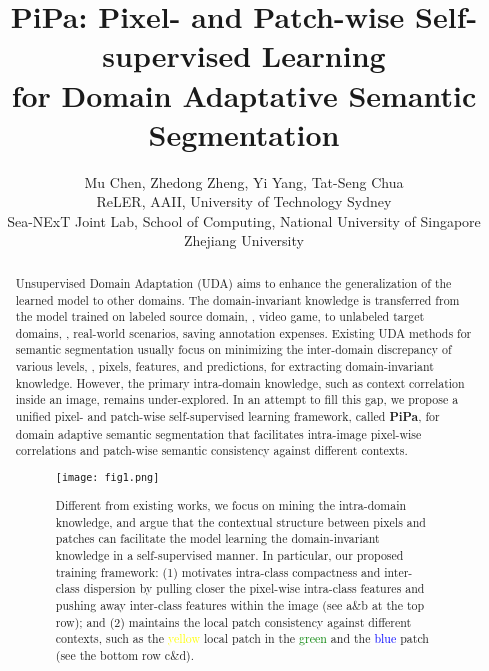 \documentclass[10pt,twocolumn,letterpaper]{article}
\begin{document}
\title{PiPa: Pixel- and Patch-wise Self-supervised Learning \\ for Domain Adaptative Semantic Segmentation}

\author{
Mu Chen, Zhedong Zheng, Yi Yang, Tat-Seng Chua\\
ReLER, AAII, University of Technology Sydney \\Sea-NExT Joint Lab, School of 
Computing, National University of Singapore \\ Zhejiang University}


\maketitle



\begin{abstract}
   Unsupervised Domain Adaptation (UDA) aims to enhance the generalization of the learned model to other domains. The domain-invariant knowledge is transferred from the model trained on labeled source domain, \eg, video game, to unlabeled target domains, \eg, real-world scenarios, saving annotation expenses. Existing UDA methods for semantic segmentation usually focus on minimizing the inter-domain discrepancy of various levels, \eg, pixels, features, and predictions, for extracting domain-invariant knowledge. 
   However, the primary intra-domain knowledge, such as context correlation inside an image, remains under-explored. 
   In an attempt to fill this gap, we propose a unified pixel- and patch-wise self-supervised learning framework, called \textbf{PiPa}, for domain adaptive semantic segmentation that facilitates intra-image pixel-wise correlations and patch-wise semantic consistency against different contexts.
\begin{figure}[]
  \centering
  \texttt{[image: fig1.png]}
  \caption{Different from existing works, we focus on mining the intra-domain knowledge, and argue that the contextual structure between pixels and patches can facilitate the model learning the domain-invariant knowledge in a self-supervised manner.
  In particular, our proposed training framework: 
  (1) motivates intra-class compactness and inter-class dispersion by pulling closer the pixel-wise intra-class features and pushing away inter-class features within the image (see a\&b at the top row);
  and  (2) maintains the local patch consistency against different contexts, such as the \textcolor{yellow}{yellow} local patch in the \textcolor{green}{green} and the \textcolor{blue}{blue} patch (see the bottom row c\&d). }

\end{figure}
\end{abstract}
\end{document}
